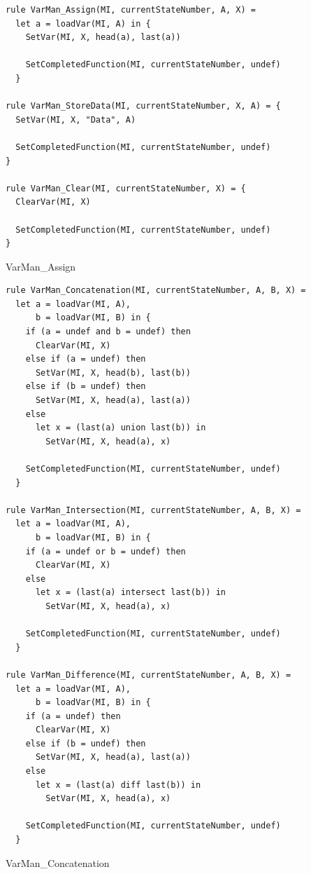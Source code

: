 \begin{listing}[H]
\begin{verbatim}
rule VarMan_Assign(MI, currentStateNumber, A, X) =
  let a = loadVar(MI, A) in {
    SetVar(MI, X, head(a), last(a))

    SetCompletedFunction(MI, currentStateNumber, undef)
  }

rule VarMan_StoreData(MI, currentStateNumber, X, A) = {
  SetVar(MI, X, "Data", A)

  SetCompletedFunction(MI, currentStateNumber, undef)
}

rule VarMan_Clear(MI, currentStateNumber, X) = {
  ClearVar(MI, X)

  SetCompletedFunction(MI, currentStateNumber, undef)
}
\end{verbatim}
\caption{VarMan\_Assign}
\label{lst:asm:VarMan_Assign}
\end{listing}




\begin{listing}[H]
\begin{verbatim}
rule VarMan_Concatenation(MI, currentStateNumber, A, B, X) =
  let a = loadVar(MI, A),
      b = loadVar(MI, B) in {
    if (a = undef and b = undef) then
      ClearVar(MI, X)
    else if (a = undef) then
      SetVar(MI, X, head(b), last(b))
    else if (b = undef) then
      SetVar(MI, X, head(a), last(a))
    else
      let x = (last(a) union last(b)) in
        SetVar(MI, X, head(a), x)

    SetCompletedFunction(MI, currentStateNumber, undef)
  }

rule VarMan_Intersection(MI, currentStateNumber, A, B, X) =
  let a = loadVar(MI, A),
      b = loadVar(MI, B) in {
    if (a = undef or b = undef) then
      ClearVar(MI, X)
    else
      let x = (last(a) intersect last(b)) in
        SetVar(MI, X, head(a), x)

    SetCompletedFunction(MI, currentStateNumber, undef)
  }

rule VarMan_Difference(MI, currentStateNumber, A, B, X) =
  let a = loadVar(MI, A),
      b = loadVar(MI, B) in {
    if (a = undef) then
      ClearVar(MI, X)
    else if (b = undef) then
      SetVar(MI, X, head(a), last(a))
    else
      let x = (last(a) diff last(b)) in
        SetVar(MI, X, head(a), x)

    SetCompletedFunction(MI, currentStateNumber, undef)
  }
\end{verbatim}
\caption{VarMan\_Concatenation}
\label{lst:asm:VarMan_Concatenation}
\end{listing}




